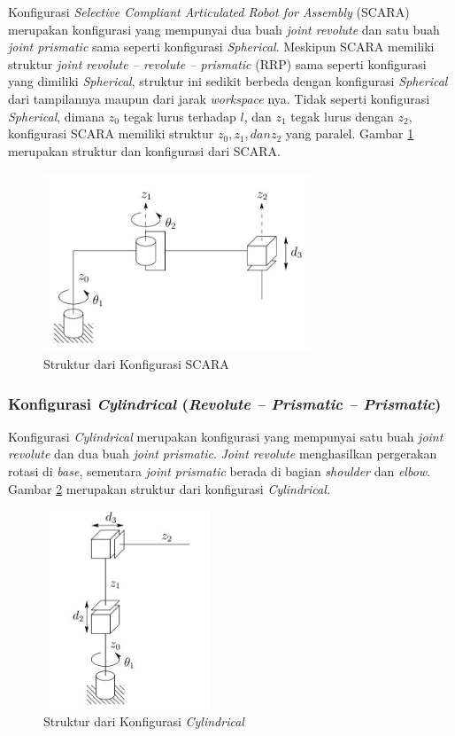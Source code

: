 Konfigurasi \textit{Selective Compliant Articulated Robot for Assembly} (SCARA) merupakan konfigurasi yang mempunyai dua buah \textit{joint revolute} dan satu buah \textit{joint prismatic} sama seperti konfigurasi \textit{Spherical}. Meskipun SCARA memiliki struktur \textit{joint revolute – revolute – prismatic} (RRP) sama seperti konfigurasi yang dimiliki \textit{Spherical}, struktur ini sedikit berbeda dengan konfigurasi \textit{Spherical} dari tampilannya maupun dari jarak \textit{workspace} nya. Tidak seperti konfigurasi \textit{Spherical}, dimana $z_{0}$ tegak lurus terhadap $l$, dan $z_{1}$ tegak lurus dengan $z_{2}$, konfigurasi SCARA memiliki struktur $z_{0}, z_{1}, dan z_{2}$ yang paralel. Gambar \ref{pic.scara} merupakan struktur dan konfigurasi dari SCARA.
	\begin{figure}[H]
	\centering
	\includegraphics[width=8cm]{gambar/scara.jpg}
	\caption{Struktur dari Konfigurasi SCARA}
	\label{pic.scara}
\end{figure}

\subsubsection{Konfigurasi \textit{Cylindrical} (\textit{Revolute – Prismatic – Prismatic}) } 

Konfigurasi \textit{Cylindrical} merupakan konfigurasi yang mempunyai satu buah \textit{joint revolute} dan dua buah \textit{joint prismatic}. \textit{Joint revolute} menghasilkan pergerakan rotasi di \textit{base}, sementara \textit{joint prismatic} berada di bagian \textit{shoulder} dan \textit{elbow}. Gambar \ref{pic.cylindrical} merupakan struktur dari konfigurasi \textit{Cylindrical.}
\begin{figure}[H]
	\centering
	\includegraphics[width=5cm]{gambar/cylindrical.jpg}
	\caption{Struktur dari Konfigurasi \textit{Cylindrical}}
	\label{pic.cylindrical}
\end{figure}
